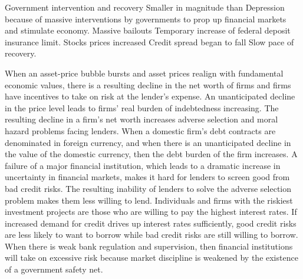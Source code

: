 \documentclass[12pt]{examnotes}
\begin{document}
Government intervention and recovery
\ra Smaller in magnitude than Depression because of massive interventions by governments to prop up financial markets and stimulate economy.
\ra Massive bailouts
\ra Temporary increase of federal deposit insurance limit.
\ra Stocks prices increased
\ra Credit spread began to fall
\ra Slow pace of recovery.

\ra When an asset-price bubble bursts and asset prices realign with fundamental economic values, there is a resulting decline in the net worth of firms and firms have incentives to take on risk at the lender's expense.
\ra  An unanticipated decline in the price level leads to firms' real burden of indebtedness increasing. The resulting decline in a firm's net worth increases adverse selection and moral hazard problems facing lenders.
\ra When a domestic firm's debt contracts are denominated in foreign currency, and when there is an unanticipated decline in the value of the domestic currency, then the debt burden of the firm increases.
\ra  A failure of a major financial institution, which leads to a dramatic increase in uncertainty in financial markets, makes it hard for lenders to screen good from bad credit risks. The resulting inability of lenders to solve the adverse selection problem makes them less willing to lend. 
\ra  Individuals and firms with the riskiest investment projects are those who are willing to pay the highest interest rates. If increased demand for credit drives up interest rates sufficiently, good
credit risks are less likely to want to borrow while bad credit risks are still willing to borrow. 
\ra When there is weak bank regulation and supervision, then financial institutions will take on excessive risk because market discipline is weakened by the existence of a government safety net.
\end{document}
